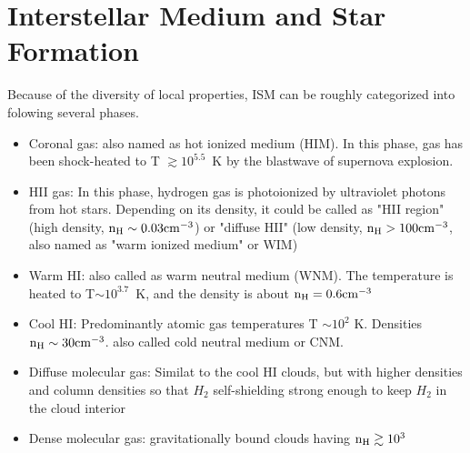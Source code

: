 \section{Interstellar Medium and Star Formation}
Because of the diversity of local properties, ISM can be roughly categorized into folowing several phases. 
\begin{itemize}
    \item Coronal gas: also named as hot ionized medium (HIM). In this phase, gas has been shock-heated to T $\gtrsim 10^{5.5}$~K by the blastwave of supernova explosion. 
    \item HII gas: In this phase, hydrogen gas is photoionized by ultraviolet photons from hot stars. Depending on its density, it could be called as "HII region" (high density, $\rm n_H \sim 0.03 cm^{-3}$) or "diffuse HII" (low density, $\rm n_H > 100 cm^{-3}$, also named as "warm ionized medium" or WIM)
    \item Warm HI: also called as warm neutral medium (WNM). The temperature is heated to T$\sim 10^{3.7}$~K, and the density is about $\rm n_H = 0.6 cm^{-3}$ 
    \item Cool HI: Predominantly atomic gas temperatures T $\sim 10^2$ K. Densities $\rm n_H \sim 30 cm^{-3}$. also called cold neutral medium or CNM.
    \item Diffuse molecular gas: Similat to the cool HI clouds, but with higher densities and column densities so that $H_2$ self-shielding strong enough to keep $H_2$ in the cloud interior
    \item Dense molecular gas: gravitationally bound clouds having $\rm n_H \gtrsim 10^3$
\end{itemize}



